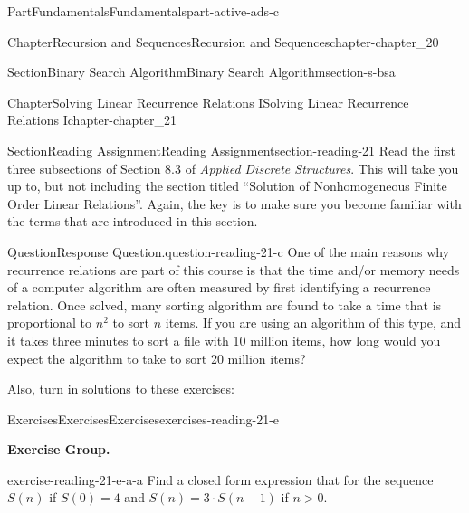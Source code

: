 \documentclass[oneside,10pt,]{book}
\numberwithin{equation}{section}
\newcommand{\gt}{>}
\begin{document}
\begin{partptx}{Part}{Fundamentals}{}{Fundamentals}{}{}{part-active-ads-c}
\begin{chapterptx}{Chapter}{Recursion and Sequences}{}{Recursion and Sequences}{}{}{chapter-chapter_20}
\begin{sectionptx}{Section}{Binary Search Algorithm}{}{Binary Search Algorithm}{}{}{section-s-bsa}
\begin{codedisplay}
\end{codedisplay}
%
\end{sectionptx}
\end{chapterptx}
%
\typeout{************************************************}
\typeout{************************************************}
%
\begin{chapterptx}{Chapter}{Solving Linear Recurrence Relations I}{}{Solving Linear Recurrence Relations I}{}{}{chapter-chapter_21}
\renewcommand*{\chaptername}{Chapter}
%
%
%
\typeout{************************************************}
\typeout{************************************************}
%
\begin{sectionptx}{Section}{Reading Assignment}{}{Reading Assignment}{}{}{section-reading-21}
Read the first three subsections of Section 8.3 of \emph{Applied Discrete Structures}.  This will take you up to, but not including the section titled ``Solution of Nonhomogeneous Finite Order Linear Relations''.   Again, the key is to make sure you become familiar with the terms that are introduced in this section.%
\begin{question}{Question}{Response Question.}{question-reading-21-c}%
One of the main reasons why recurrence relations are part of this course is that the time and\slash{}or memory needs of a computer algorithm are often measured by first identifying a recurrence relation.  Once solved, many sorting algorithm are found to take a time that is proportional to \(n^2\) to sort \(n\) items.  If you are using an algorithm of this type, and it takes three minutes to sort a file with 10 million items, how long would you expect the algorithm to take to sort 20 million items?%
\end{question}
Also, turn in solutions to these exercises:%
%
%
\typeout{************************************************}
\typeout{************************************************}
%
\begin{exercises-subsection-numberless}{Exercises}{Exercises}{}{Exercises}{}{}{exercises-reading-21-e}
\par\medskip\noindent%
\textbf{Exercise Group.}\space\space%
\begin{exercisegroup}
\begin{divisionexerciseeg}{1}{}{}{exercise-reading-21-e-a-a}%
Find a closed form expression that for the sequence \(S(n)\) if  \(S(0)=4\) and \(S(n)=3 \cdot S(n-1)\) if \(n \gt 0\).%

\end{divisionexerciseeg}
\end{exercisegroup}
\end{exercises-subsection-numberless}
\end{sectionptx}
\end{chapterptx}
\end{partptx}
\end{document}
